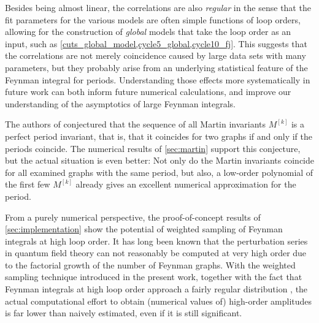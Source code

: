 \documentclass[11pt]{scrartcl}
\numberwithin{equation}{section}
\begin{document}
Besides being almost linear,  the correlations are also \emph{regular} in the sense that the fit parameters for the various models are often simple functions of loop orders, allowing for the construction of \emph{global} models that take the loop order as an input, such as \cref{cuts_global_model,cycle5_global,cycle10_fj}. This suggests that the correlations are not merely coincidence caused by large data sets with many parameters, but they probably arise from an underlying statistical feature of the Feynman integral for periods. Understanding those effects more systematically in future work can both inform future numerical calculations, and improve our understanding of the asymptotics of large Feynman integrals.  


The authors of \cite{panzer_feynman_2023}  conjectured that the sequence of all Martin invariants $M^{[k]}$ is a perfect period invariant, that is, that it coincides for two graphs if and only if the periods coincide. The numerical results of \cref{sec:martin} support this conjecture, but the actual situation is even better: Not only do the Martin invariants coincide for all examined graphs with the same period, but also, a low-order polynomial of the first few $M^{[k]}$ already gives an excellent numerical approximation for the period. 

From a purely numerical perspective, the proof-of-concept results of \cref{sec:implementation} show the potential of weighted sampling of Feynman integrals at high loop order. It has long been known that the perturbation series in quantum field theory can not reasonably be computed at very high order due to the factorial growth of the number of Feynman graphs. With the  weighted sampling technique introduced in the present work, together with the fact that Feynman integrals at high loop order approach a fairly regular distribution \cite{balduf_statistics_2023}, the actual computational effort to obtain (numerical values of) high-order amplitudes is far lower than naively estimated, even if it is still significant. 
\end{document}

